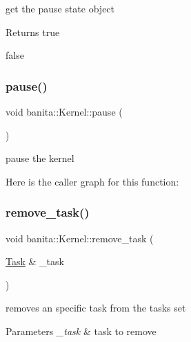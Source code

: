get the pause state object 

\begin{DoxyReturn}{Returns}
true 

false 
\end{DoxyReturn}
\mbox{\label{classbanita_1_1_kernel_a69c51724e7192464b086b3c357fdcb7f}} 
\subsubsection{\texorpdfstring{pause()}{pause()}}
{\footnotesize\ttfamily void banita\+::\+Kernel\+::pause (\begin{DoxyParamCaption}{ }\end{DoxyParamCaption})\hspace{0.3cm}{\ttfamily [inline]}}



pause the kernel 

Here is the caller graph for this function\+:
\mbox{\label{classbanita_1_1_kernel_a463aa154233f381167fc18f6e754b084}} 
\subsubsection{\texorpdfstring{remove\_task()}{remove\_task()}}
{\footnotesize\ttfamily void banita\+::\+Kernel\+::remove\+\_\+task (\begin{DoxyParamCaption}\item[{\mbox{\hyperlink{classbanita_1_1_task}{Task}} \&}]{\+\_\+task }\end{DoxyParamCaption})\hspace{0.3cm}{\ttfamily [inline]}}



removes an specific task from the tasks set 


\begin{DoxyParams}{Parameters}
{\em \+\_\+task} & task to remove \\
\hline
\end{DoxyParams}
\mbox{\label{classbanita_1_1_kernel_af596d1e111f5d7dd9d9e483eda630695}} 
